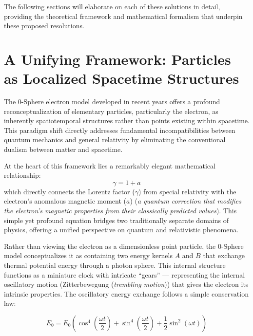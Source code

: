 \documentclass[12pt,letterpaper]{article} %
\begin{document}
The following sections will elaborate on each of these solutions in detail, providing the theoretical framework and mathematical formalism that underpin these proposed resolutions.



\section{A Unifying Framework: Particles as Localized Spacetime Structures}

The 0-Sphere electron model developed in recent years offers a profound reconceptualization of elementary particles, particularly the electron, as inherently spatiotemporal structures rather than points existing within spacetime\cite{hanamura2020}. This paradigm shift directly addresses fundamental incompatibilities between quantum mechanics and general relativity by eliminating the conventional dualism between matter and spacetime.

At the heart of this framework lies a remarkably elegant mathematical relationship:
\begin{equation}
\gamma = 1 + a
\end{equation}
which directly connects the Lorentz factor ($\gamma$) from special relativity with the electron's anomalous magnetic moment ($a$) (\textit{a quantum correction that modifies the electron's magnetic properties from their classically predicted values})\cite{hanamura2025}. This simple yet profound equation bridges two traditionally separate domains of physics, offering a unified perspective on quantum and relativistic phenomena.

Rather than viewing the electron as a dimensionless point particle, the 0-Sphere model conceptualizes it as containing two energy kernels $A$ and $B$ that exchange thermal potential energy through a photon sphere\cite{hanamura2018}. This internal structure functions as a miniature clock with intricate ``gears'' --- representing the internal oscillatory motion (Zitterbewegung (\textit{trembling motion})) that gives the electron its intrinsic properties\cite{schrodinger1930}. The oscillatory energy exchange follows a simple conservation law:

\begin{equation}
E_0 = E_0 \left( \cos^4 \left( \frac{\omega t}{2} \right) + \sin^4 \left( \frac{\omega t}{2} \right) + \frac{1}{2} \sin^2 (\omega t) \right)
\label{eq:energy_conservation}
\end{equation}
\end{document}
